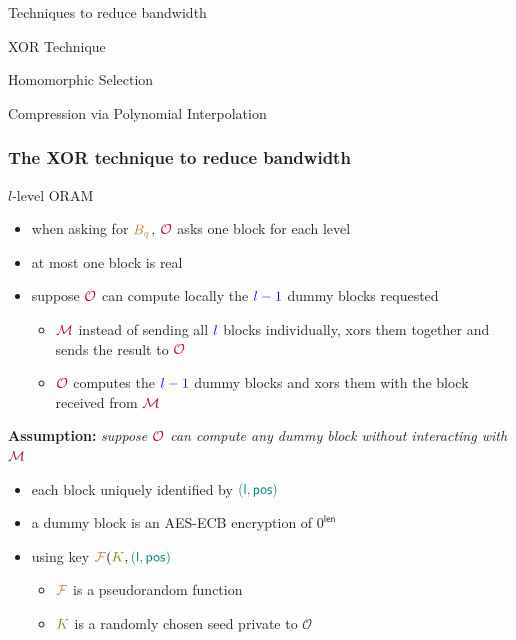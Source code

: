 \documentclass[]{beamer}
\newcommand{\owner}{\mathcal{O}}
\newcommand{\manager}{\mathcal{M}}
\begin{document}
{\begin{frame}
\pause

\begin{block}{Techniques to reduce bandwidth}
\begin{itemize}
{\color{brown}
\item XOR Technique
\item Homomorphic Selection
\item Compression via Polynomial Interpolation
}
\end{itemize}
\end{block}
\end{frame}

\begin{frame}
\frametitle{The XOR technique to reduce bandwidth}

{\color{purple} $l$-level ORAM}
\vskip 1cm
\begin{itemize}[<+->]
\item when asking for $\color{brown}B_q$,
    $\color{purple}\owner$ asks one block {\color{blue} for each level}
\item at most one block is {\color{blue}real}
\item suppose $\color{purple}\owner$ can compute locally the $\color{blue} l-1$ dummy blocks requested
    \begin{itemize}
        \item $\color{purple}\manager$ instead of sending all $\color{blue} l$ blocks individually,
{\color{red} xors} them together and sends the result to $\color{purple}\owner$
        \item $\color{purple}\owner$ computes the $\color{blue} l-1$ dummy blocks and 
{\color{red} xors} them with
        the block received from $\color{purple}\manager$
    \end{itemize}
\end{itemize}
\end{frame}

\begin{frame}
{\color{brown}\bf Assumption:} {\em suppose $\color{purple}\owner$ can compute any {\color{teal} dummy} block without interacting with  $\color{purple}\manager$}

\begin{itemize}
\item each block uniquely identified by $\color{teal} (\mathsf{l,pos})$
\item a {\color{teal}dummy} block is an AES-ECB encryption of $0^{\mathsf{len}}$  
\item using key ${\color{brown}\cal F}({\color{olive} K},\color{teal}(\mathsf{l,pos})$
    \begin{itemize}
        \item ${\color{brown}\cal F}$ is a pseudorandom function
        \item ${\color{olive} K}$ is a randomly chosen seed private to $\owner$
    \end{itemize}
\end{itemize}
\end{frame}

}
\end{document}
